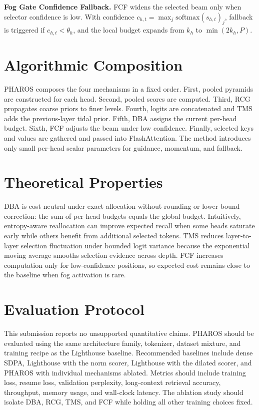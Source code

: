 \documentclass[letterpaper]{article}
\begin{document}
\textbf{Fog Gate Confidence Fallback.} FCF widens the selected beam only when selector confidence is low. With confidence $c_{h,t}=\max_j\mathrm{softmax}(s_{h,t})_j$, fallback is triggered if $c_{h,t}<\theta_h$, and the local budget expands from $k_h$ to $\min(2k_h,P)$.

\section{Algorithmic Composition}
PHAROS composes the four mechanisms in a fixed order. First, pooled pyramids are constructed for each head. Second, pooled scores are computed. Third, RCG propagates coarse priors to finer levels. Fourth, logits are concatenated and TMS adds the previous-layer tidal prior. Fifth, DBA assigns the current per-head budget. Sixth, FCF adjusts the beam under low confidence. Finally, selected keys and values are gathered and passed into FlashAttention. The method introduces only small per-head scalar parameters for guidance, momentum, and fallback.

\section{Theoretical Properties}
DBA is cost-neutral under exact allocation without rounding or lower-bound correction: the sum of per-head budgets equals the global budget. Intuitively, entropy-aware reallocation can improve expected recall when some heads saturate early while others benefit from additional selected tokens. TMS reduces layer-to-layer selection fluctuation under bounded logit variance because the exponential moving average smooths selection evidence across depth. FCF increases computation only for low-confidence positions, so expected cost remains close to the baseline when fog activation is rare.

\section{Evaluation Protocol}
This submission reports no unsupported quantitative claims. PHAROS should be evaluated using the same architecture family, tokenizer, dataset mixture, and training recipe as the Lighthouse baseline. Recommended baselines include dense SDPA, Lighthouse with the norm scorer, Lighthouse with the dilated scorer, and PHAROS with individual mechanisms ablated. Metrics should include training loss, resume loss, validation perplexity, long-context retrieval accuracy, throughput, memory usage, and wall-clock latency. The ablation study should isolate DBA, RCG, TMS, and FCF while holding all other training choices fixed.
\end{document}

